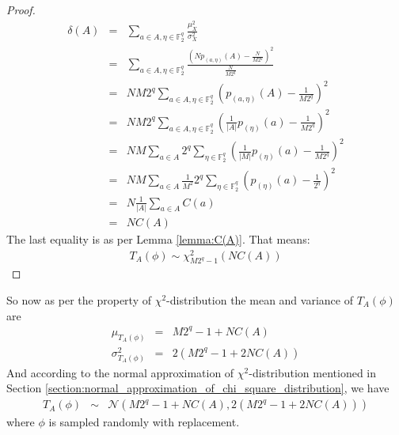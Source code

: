 \begin{proof}
\begin{eqnarray*}
\delta(A) &=& \displaystyle\sum_{a \in A, \eta \in \mathbb{F}_{2}^{q}}\frac{\mu_{X}^2}{\sigma^{2}_{X}}\\
&=& \displaystyle\sum_{a \in A, \eta \in \mathbb{F}_{2}^{q}}\frac{(Np_{\left(a,\eta\right)}(A) - \frac{N}{M2^q})^2}{\frac{N}{M2^q}}\\
&=& NM2^q\displaystyle\sum_{a \in A, \eta \in \mathbb{F}_{2}^{q}}\left(p_{\left(a,\eta\right)}(A) - \frac{1}{M2^q}\right)^2 \\
&=& NM2^q\displaystyle\sum_{a \in A, \eta \in \mathbb{F}_{2}^{q}}\left(\frac{1}{|A|}p_{\left(\eta\right)}(a) - \frac{1}{M2^q}\right)^2 \\
&=& NM\displaystyle\sum_{a \in A} 2^q \displaystyle\sum_{\eta \in \mathbb{F}_{2}^{q}}\left(\frac{1}{|M|}p_{\left(\eta\right)}(a) - \frac{1}{M2^q}\right)^2 \\
&=& NM\displaystyle\sum_{a \in A} \frac{1}{M^2} 2^q \displaystyle\sum_{\eta \in \mathbb{F}_{2}^{q}}\left(p_{\left(\eta\right)}(a) - \frac{1}{2^q}\right)^2 \\
&=& N\frac{1}{|A|}\displaystyle\sum_{a \in A} C\left(a\right) \\
&=& NC(A)
\end{eqnarray*} The last equality is as per Lemma \ref{lemma:C(A)}. That means:
\begin{eqnarray*}
T_{A}(\phi) \sim \chi^{2}_{M2^q-1}(NC(A))
\end{eqnarray*}
\end{proof}\noindent So now as per the property of $\chi^2$-distribution the mean and variance of $T_{A}(\phi)$ are 
\begin{eqnarray}
\mu_{T_{A}(\phi)} &=& M2^q-1+NC(A) \label{eqn:T_A_phi_mean} \\
\sigma_{T_{A}(\phi)}^{2} &=& 2(M2^q-1+2NC(A)) \label{eqn:T_A_phi_variance}
\end{eqnarray}And according to the normal approximation of $\chi^2$-distribution mentioned in Section \ref{section:normal_approximation_of_chi_square_distribution}, we have 
\begin{eqnarray}
T_{A}(\phi) &\sim & \mathcal{N}\left(M2^q-1+NC(A),2(M2^q-1+2NC(A))\right) \label{eqn:T_A_phi_variable_phi_fixed_A}
\end{eqnarray}
where $\phi$ is sampled randomly with replacement.
